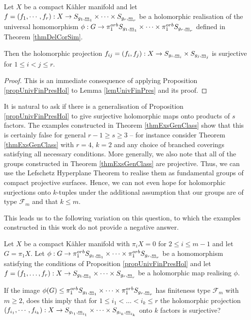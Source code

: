 \begin{corollary}
Let $X$ be a compact K\"ahler manifold and let $f=(f_1,\cdots,f_r): X \rightarrow S_{g_1,{\underline{m}}_1} \times \cdots \times S_{g_r,{\underline{m}}_r}$  be a holomorphic realisation of the universal homomorphism $\phi: G\rightarrow \pi_1^{orb} S_{g_1,{\underline{m}}_1} \times \cdots \times \pi_1^{orb} S_{g_r,{\underline{m}}_r}$ defined in Theorem \ref{thmDelCorSim}.

  Then the holomorphic projection $f_{ij}=(f_i,f_j): X \rightarrow S_{g_i,{\underline{m}}_i} \times S_{g_j,{\underline{m}}_j}$ is surjective for $1\leq i < j \leq r$.
\end{corollary}
\begin{proof}
This is an immediate consequence of applying Proposition \ref{propUnivFinPresHol} to Lemma \ref{lemUnivFinPres} and its proof.
\end{proof}

It is natural to ask if there is a generalisation of Proposition \ref{propUnivFinPresHol} to give surjective holomorphic maps onto products of $s$ factors. The examples constructed in Theorem \ref{thmExsGenClass} show that this is certainly false for general $r-1 \geq s\geq 3$ -- for instance consider Theorem \ref{thmExsGenClass} with $r=4$, $k=2$ and any choice of branched coverings satisfying all necessary conditions. More generally, we also note that all of the groups constructed in Theorem \ref{thmExsGenClass} are projective. Thus, we can use the Lefschetz Hyperplane Theorem to realise them as fundamental groups of compact projective surfaces. Hence, we can not even hope for holomorphic surjections onto $k$-tuples under the additional assumption that our groups are of type $\mathcal{F}_m$ and that $k\leq m$.

This leads us to the following variation on this question, to which the examples constructed in this work do not provide a negative answer.

\begin{question*}
Let $X$ be a compact K\"ahler manifold with $\pi_i X=0$ for $2\leq i \leq m-1$ and let $G=\pi_1 X$. Let $\phi: G\rightarrow  \pi_1^{orb} S_{g_1,{\underline{m}}_1}\times \dots \times \pi_1^{orb} S_{g_r,{\underline{m}}_r}$ be a homomorphism satisfying the conditions of Proposition \ref{propUnivFinPresHol} and let $f=(f_1,\dots,f_r):X\rightarrow  S_{g_1,{\underline{m}}_1}\times \dots \times  S_{g_r,{\underline{m}}_r}$ be a holomorphic map realising $\phi$. 

If the image $\phi(G)\leq \pi_1^{orb} S_{g_1,{\underline{m}}_1}\times \dots \times \pi_1^{orb} S_{g_r,{\underline{m}}_r}$ has finiteness type $\mathcal{F}_m$ with $m\geq 2$, does this imply that for $1\leq i_1 < \dots < i_k\leq r$ the holomorphic projection $(f_{i_1},\cdots,f_{i_k}): X \rightarrow S_{g_{i_1},{\underline{m}}_{i_1}}\times \dots \times S_{g_{i_k},{\underline{m}}_{i_k}}$ onto $k$ factors is surjective?
\end{question*}


